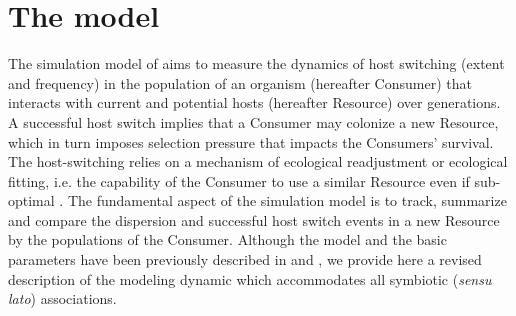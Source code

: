 \section{The model}
The simulation model of  aims to measure the dynamics of host switching (extent and frequency) in the population of an organism (hereafter Consumer) that interacts with current and potential hosts (hereafter Resource) over generations. A successful host switch implies that a Consumer may colonize a new Resource, which in turn imposes selection pressure that impacts the Consumers' survival. The host-switching relies on a mechanism of ecological readjustment or ecological fitting, i.e. the capability of the Consumer to use a similar Resource even if sub-optimal \citep{janzen1985ecological,agosta2008ecological}.
The fundamental aspect of the  simulation model is to track, summarize and compare the dispersion and successful host switch events in a new Resource by the populations of the Consumer.
Although the model and the basic parameters have been previously described in \citet{araujo_understanding_2015} and \citet{feronato_accidents_2021}, we provide here a revised description of the modeling dynamic which accommodates all symbiotic (\emph{sensu lato}) associations.

